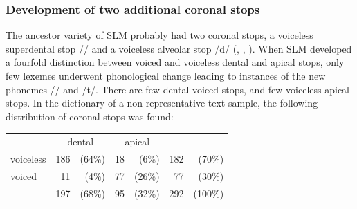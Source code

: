\subsubsection[\dentt, \dentd, \dz, \tz]{Development of two additional coronal stops}
The ancestor variety of SLM probably had two coronal stops, a voiceless superdental stop /\dentt{}/ and a voiceless alveolar stop /d/ (\citet[10]{Adelaar1985}, \citet[26]{Adelaar1991}, \citet{SmithEtAl2004}). When SLM developed a fourfold distinction between voiced and voiceless dental and apical stops, only few lexemes underwent phonological change leading to instances of the new phonemes /\dentd/ and /t/. There are few dental voiced stops, and few voiceless apical stops. In the dictionary of a non-representative text sample, the following distribution of coronal stops was found:
% 
% 
% 


\begin{center}
\begin{tabular}{lrrrr|rr}
		& \multicolumn{2}{c}{dental}&\multicolumn{2}{c}{apical}\\
voiceless 	& 186& (64\%)	& 18 &(6\%)	& 182 & (70\%)\\
voiced 		& 11 &(4\%)	& 77& (26\%)	& 77 & (30\%)\\
\hline
		& 197 &(68\%)	& 95 &(32\%)	& 292 & (100\%)
\end{tabular}
\end{center}


